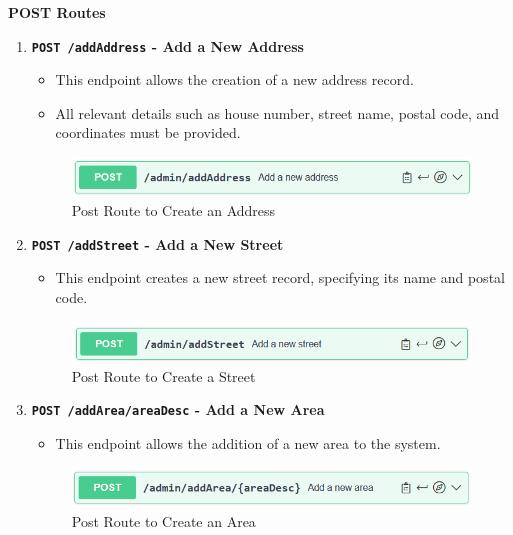     \pagebreak

    \textbf{POST Routes}
    \begin{enumerate}
        \item \textbf{\texttt{POST /addAddress} - Add a New Address}
        \begin{itemize}
            \item This endpoint allows the creation of a new address record.
            \item All relevant details such as house number, street name, postal code, and coordinates must be provided.
        \end{itemize} 
        \begin{figure} [H]
            \centering
            \includegraphics [width=1\textwidth] {images/andreas/praxis/addAddress.png}
            \caption{Post Route to Create an Address}
        \end{figure}

        \item \textbf{\texttt{POST /addStreet} - Add a New Street}
        \begin{itemize}
            \item This endpoint creates a new street record, specifying its name and postal code.
        \end{itemize} 
        \begin{figure} [H]
            \centering
            \includegraphics [width=1\textwidth] {images/andreas/praxis/addStreet.png}
            \caption{Post Route to Create a Street}
        \end{figure}

        \item \textbf{\texttt{POST /addArea/{areaDesc}} - Add a New Area}
        \begin{itemize}
            \item This endpoint allows the addition of a new area to the system.
        \end{itemize} 
        \begin{figure} [H]
            \centering
            \includegraphics [width=1\textwidth] {images/andreas/praxis/addArea.png}
            \caption{Post Route to Create an Area}
        \end{figure}


\end{enumerate}
